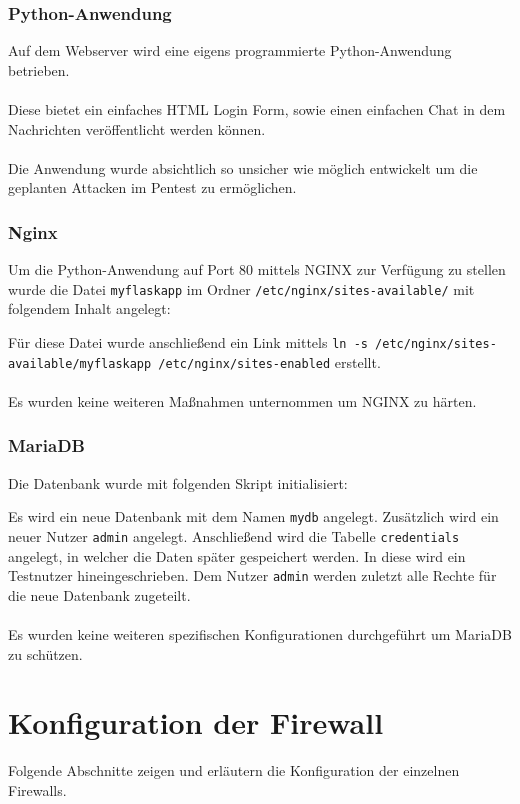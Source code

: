 \documentclass[
    a4paper,
    pagesize,
	pdftex,
    12pt,
]{scrartcl}
\begin{document}
\subsubsection{Python-Anwendung}
Auf dem Webserver wird eine eigens programmierte Python-Anwendung betrieben. \\ \\
Diese bietet ein einfaches HTML Login Form, sowie einen einfachen Chat in dem Nachrichten veröffentlicht werden können. \\ \\
Die Anwendung wurde absichtlich so unsicher wie möglich entwickelt um die geplanten Attacken im Pentest zu  ermöglichen.

\subsubsection{Nginx}
Um die Python-Anwendung auf Port 80 mittels NGINX zur  Verfügung zu stellen wurde die Datei  \lstinline[breaklines]|myflaskapp| im Ordner \lstinline[breaklines]|/etc/nginx/sites-available/| mit  folgendem Inhalt angelegt:

Für diese Datei wurde anschließend ein Link mittels 
\lstinline[breaklines]|ln -s /etc/nginx/sites-available/myflaskapp /etc/nginx/sites-enabled|  erstellt. \\ \\
Es wurden keine weiteren Maßnahmen unternommen um NGINX zu härten.

\subsubsection{MariaDB}
Die Datenbank wurde mit folgenden Skript initialisiert:

Es wird ein neue Datenbank mit dem Namen \lstinline[breaklines]|mydb| angelegt. Zusätzlich wird ein neuer Nutzer \lstinline[breaklines]|admin| angelegt. Anschließend wird die Tabelle \lstinline[breaklines]|credentials| angelegt, in welcher die Daten später gespeichert werden. In diese wird ein Testnutzer hineingeschrieben. Dem Nutzer \lstinline[breaklines]|admin| werden zuletzt alle Rechte für die neue Datenbank zugeteilt. \\ \\
Es wurden keine weiteren spezifischen Konfigurationen durchgeführt um MariaDB zu schützen.

\newpage
\section{Konfiguration der Firewall}
Folgende Abschnitte zeigen und erläutern die Konfiguration der einzelnen Firewalls.
\end{document}

